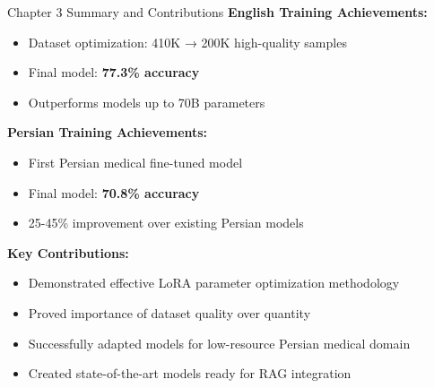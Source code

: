 \begin{frame}{Chapter 3 Summary and Contributions}
    \textbf{English Training Achievements:}
    \begin{itemize}
        \item Dataset optimization: 410K → 200K high-quality samples
        \item Final model: \textbf{77.3\% accuracy}
        \item Outperforms models up to 70B parameters
    \end{itemize}
    
    \vspace{0.5em}
    
    \textbf{Persian Training Achievements:}
    \begin{itemize}
        \item First Persian medical fine-tuned model
        \item Final model: \textbf{70.8\% accuracy}
        \item 25-45\% improvement over existing Persian models
    \end{itemize}
    
    \vspace{0.5em}
    
    \textbf{Key Contributions:}
    \begin{itemize}
        \item Demonstrated effective LoRA parameter optimization methodology
        \item Proved importance of dataset quality over quantity
        \item Successfully adapted models for low-resource Persian medical domain
        \item Created state-of-the-art models ready for RAG integration
    \end{itemize}
\end{frame}
